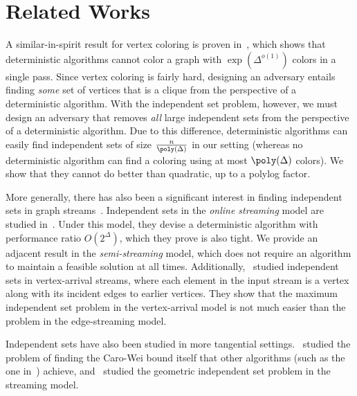 \section{Related Works}
A similar-in-spirit result for vertex coloring is proven in~\cite{assadi2022deterministic}, which shows that deterministic algorithms cannot color a graph with $\exp(\Delta^{o(1)})$ colors in a single pass. Since vertex coloring is fairly hard, designing an adversary entails finding \textit{some} set of vertices that is a clique from the perspective of a deterministic algorithm. With the independent set problem, however, we must design an adversary that removes \textit{all} large independent sets from the perspective of a deterministic algorithm. Due to this difference, deterministic algorithms can easily find independent sets of size $\frac n{\poly(\Delta)}$ in our setting (whereas no deterministic algorithm can find a coloring using at most $\poly(\Delta)$ colors). We show that they cannot do better than quadratic, up to a polylog factor. 

More generally, there has also been a significant interest in finding independent sets in graph streams\ \cite{ahn2015correlation, assadi2024log, halldorsson2010streaming, chen2023sublinear, cormode2017independent, bhore2022streaming, bakshi2019weighted}. Independent sets in the \textit{online streaming} model are studied in~\cite{halldorsson2016streaming}. Under this model, they devise a deterministic algorithm with performance ratio $O(2^{\Delta})$, which they prove is also tight. We provide an adjacent result in the \textit{semi-streaming} model, which does not require an algorithm to maintain a feasible solution at all times. Additionally,\ \cite{cormode2018independent} studied independent sets in vertex-arrival streams, where each element in the input stream is a vertex along with its incident edges to earlier vertices. They show that the maximum independent set problem in the vertex-arrival model is not much easier than the problem in the edge-streaming model. 

Independent sets have also been studied in more tangential settings.\ \cite{cormode2018approximating} studied the problem of finding the Caro-Wei bound itself that other algorithms (such as the one in\ \cite{halldorsson2010streaming}) achieve, and\ \cite{bhore2022streaming} studied the geometric independent set problem in the streaming model.